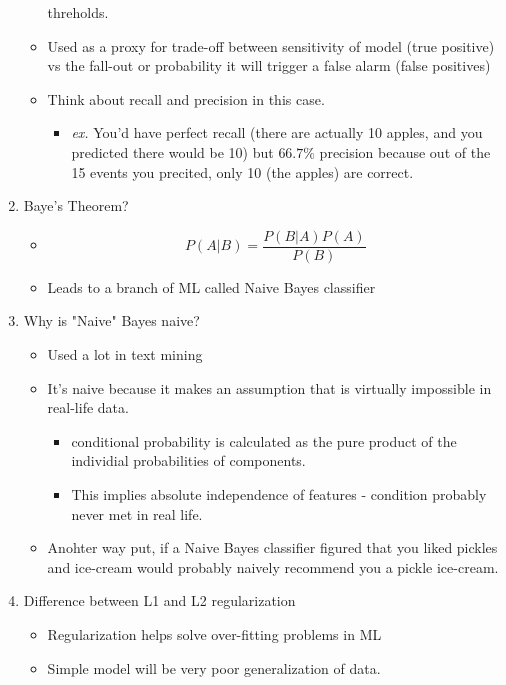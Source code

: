 \documentclass[12pt,a4paper]{article}
\begin{document}
\begin{enumerate}
\begin{itemize}
            threholds. 
      \item Used as a proxy for trade-off between sensitivity of model (true positive) vs the 
            fall-out or probability it will trigger a false alarm (false positives)
      \item Think about recall and precision in this case.
        \begin{itemize}
          \item \textit{ex. } You'd have perfect recall (there are actually 10 apples, and you 
                predicted there would be 10) but $66.7\%$ precision because out of the 15 events 
                you precited, only 10 (the apples) are correct.
        \end{itemize}
    \end{itemize}
    \item  Baye's Theorem?
    \begin{itemize}
      \item $$P(A|B) = \frac{P(B|A)P(A)}{P(B)}$$
      \item Leads to a branch of ML called Naive Bayes classifier
    \end{itemize}
    \item Why is "Naive" Bayes naive?
    \begin{itemize}
      \item Used a lot in text mining
      \item It's naive because it makes an assumption that is virtually impossible in real-life data. 
      \begin{itemize}
        \item conditional probability is calculated as the pure product of the individial probabilities of components.
        \item This implies absolute independence of features - condition probably never met in real life.
      \end{itemize}
      \item Anohter way put, if a Naive Bayes classifier figured that you liked pickles and ice-cream 
            would probably naively recommend you a pickle ice-cream.
    \end{itemize}
    \item Difference between L1 and L2 regularization
    \begin{itemize} %
      \item Regularization helps solve over-fitting problems in ML
      \item Simple model will be very poor generalization of data. 

\end{itemize}
\end{enumerate}
\end{document}
